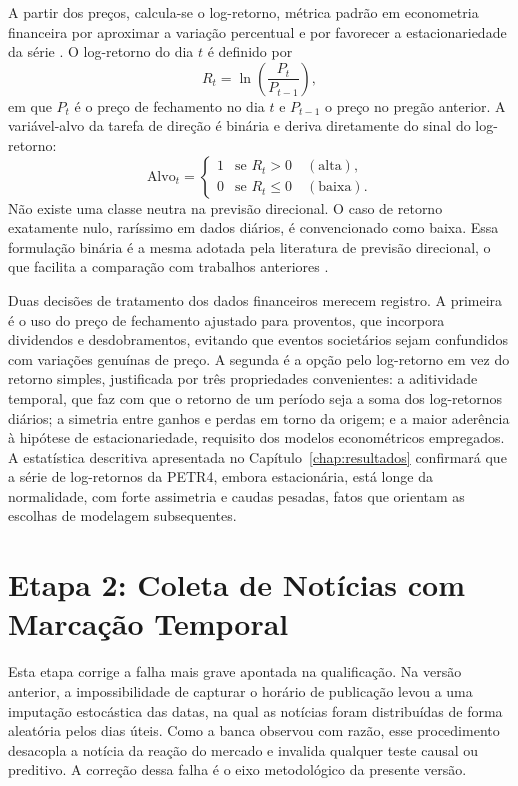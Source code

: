 A partir dos preços, calcula-se o log-retorno, métrica padrão em econometria financeira por aproximar a variação percentual e por favorecer a estacionariedade da série \cite{nizer_metodo_2011}. O log-retorno do dia $t$ é definido por
\begin{equation}
R_t = \ln\left(\frac{P_t}{P_{t-1}}\right),
\end{equation}
em que $P_t$ é o preço de fechamento no dia $t$ e $P_{t-1}$ o preço no pregão anterior. A variável-alvo da tarefa de direção é binária e deriva diretamente do sinal do log-retorno:
\begin{equation}
\text{Alvo}_t =
\begin{cases}
1 & \text{se } R_t > 0 \quad (\text{alta}),\\
0 & \text{se } R_t \le 0 \quad (\text{baixa}).
\end{cases}
\end{equation}
Não existe uma classe neutra na previsão direcional. O caso de retorno exatamente nulo, raríssimo em dados diários, é convencionado como baixa. Essa formulação binária é a mesma adotada pela literatura de previsão direcional, o que facilita a comparação com trabalhos anteriores \cite{ballings_evaluating_2015}.

Duas decisões de tratamento dos dados financeiros merecem registro. A primeira é o uso do preço de fechamento ajustado para proventos, que incorpora dividendos e desdobramentos, evitando que eventos societários sejam confundidos com variações genuínas de preço. A segunda é a opção pelo log-retorno em vez do retorno simples, justificada por três propriedades convenientes: a aditividade temporal, que faz com que o retorno de um período seja a soma dos log-retornos diários; a simetria entre ganhos e perdas em torno da origem; e a maior aderência à hipótese de estacionariedade, requisito dos modelos econométricos empregados. A estatística descritiva apresentada no Capítulo~\ref{chap:resultados} confirmará que a série de log-retornos da PETR4, embora estacionária, está longe da normalidade, com forte assimetria e caudas pesadas, fatos que orientam as escolhas de modelagem subsequentes.

\section{Etapa 2: Coleta de Notícias com Marcação Temporal}

Esta etapa corrige a falha mais grave apontada na qualificação. Na versão anterior, a impossibilidade de capturar o horário de publicação levou a uma imputação estocástica das datas, na qual as notícias foram distribuídas de forma aleatória pelos dias úteis. Como a banca observou com razão, esse procedimento desacopla a notícia da reação do mercado e invalida qualquer teste causal ou preditivo. A correção dessa falha é o eixo metodológico da presente versão.

